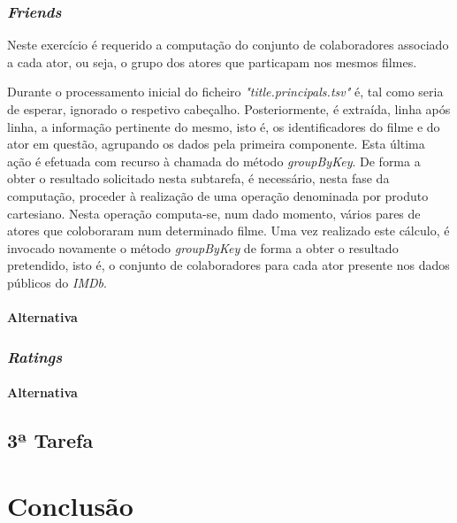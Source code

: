 \documentclass[a4paper]{report}
\begin{document}
{	\subsection{\textit{Friends}} \label{subsec:Task2-Friends}
		Neste exercício é requerido a computação do conjunto de colaboradores associado a cada ator, ou seja, o grupo dos atores que particapam nos mesmos filmes.
			
		Durante o processamento inicial do ficheiro \textsl{"title.principals.tsv"} é, tal como seria de esperar, ignorado o respetivo cabeçalho.
		Posteriormente, é extraída, linha após linha, a informação pertinente do mesmo, isto é, os identificadores do filme e do ator em questão, agrupando os dados pela primeira componente. Esta última ação é efetuada com recurso à chamada do método \textit{groupByKey}.
		De forma a obter o resultado solicitado nesta subtarefa, é necessário, nesta fase da computação, proceder à realização de uma operação denominada por produto cartesiano. Nesta operação computa-se, num dado momento, vários pares de atores que coloboraram num determinado filme.
		Uma vez realizado este cálculo, é invocado novamente o método \textit{groupByKey} de forma a obter o resultado pretendido, isto é, o conjunto de colaboradores para cada ator presente nos dados públicos do \textit{IMDb}.

		\subsubsection{Alternativa} \label{sssec:Task2-Friends-Alternativa}

	\subsection{\textit{Ratings}} \label{subsec:Task2-Ratings}
		\subsubsection{Alternativa} \label{sssec:Task2-Ratings-Alternativa}

	\section{3ª Tarefa} \label{sec:Task3}


\chapter{Conclusão} \label{ch:Conclusion}
\large{
	
}}
\end{document}
